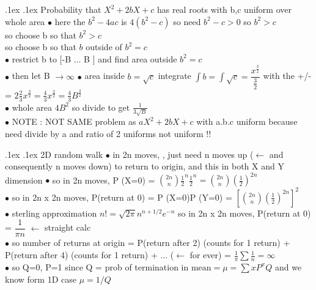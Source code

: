 \documentclass[10pt,landscape,a4paper]{article}
\makeatletter
\renewcommand{\section}{\@startsection{section}{1}{0mm}%
                                {.1ex}%
                                {.1ex}%
                                {\color{blue}\sffamily\small\bfseries}}
\makeatother
\begin{document}
\begin{multicols*}{3}
\begin{spacing}{0.1}
\section{Probability that $X^2 +2 bX + c$ has real roots with b,c uniform over whole area}
$\bullet$ here the $b^2 -4ac$ is $4(b^2-c)$ so need $b^2-c  > 0$ so $b^2 > c$ \\
so choose b so that $b^2 > c$ \\
so choose b so that $b$ outside of $b^2 = c$ \\
$\bullet$ restrict b to [-B ... B ] and find area outside $b^2 = c$ \\
$\bullet$ then let B $\rightarrow \infty$
$\bullet$ area inside $b = \sqrt{c}$ integrate $ \int b = \int \sqrt{c} = \dfrac{ x^{\frac{3}{2}} } { \frac{3}{2}}$ with the +/- = $2 \frac{2}{3} x^{\frac{3}{2}} = \frac{4}{3} x^{\frac{3}{2}} = \frac{4}{3} B^{\frac{3}{2}} $\\
$\bullet$ whole area $4B^2$ so divide to get $\frac{1}{3 \sqrt{B}}$ \\
$\bullet$ NOTE : NOT SAME problem as $aX^2 +2 bX + c$ with a.b.c uniform because need divide by a and ratio of 2 uniforms not uniform !!

\section{2D random walk}
$\bullet$ in 2n moves, , just need n moves up ($\leftarrow$ and consequently n moves down) to return to origin, and this in both X and Y dimension
$\bullet$ so in 2n moves, P (X=0) = $\binom{2n}{n} {\frac{1}{2}}^n {\frac{1}{2}}^n = \binom{2n}{n} {\left( \frac{1}{2}\right) }^{2n}$ \\
$\bullet$ so in 2n x 2n  moves, P(return at 0) =  P (X=0)P (Y=0) = ${\left[  \binom{2n}{n} {\left( \frac{1}{2}\right) }^{2n} \right]  }^2$ \\
$\bullet$ sterling approximation $n!=\sqrt{2\pi} {n}^{n+1/2}{e}^{-n}$ so in 2n x 2n  moves, P(return at 0) = $ \dfrac{1}{\pi n}$ $\leftarrow$ straight calc \\
$\bullet$ so number of returns at origin = P(return after 2) (counts for 1 return) + P(return after 4) (counts for 1 return) + ... ($\leftarrow$ for ever) = $\frac{1}{\pi}\sum \frac{1}{n} = \infty$ \\
$\bullet$  so Q=0, P=1 since  Q = prob of termination in $\text{mean} = \mu = \sum x P^x Q$ and we know form 1D case $\mu = 1/Q$


\end{spacing}
\end{multicols*}
\end{document}
